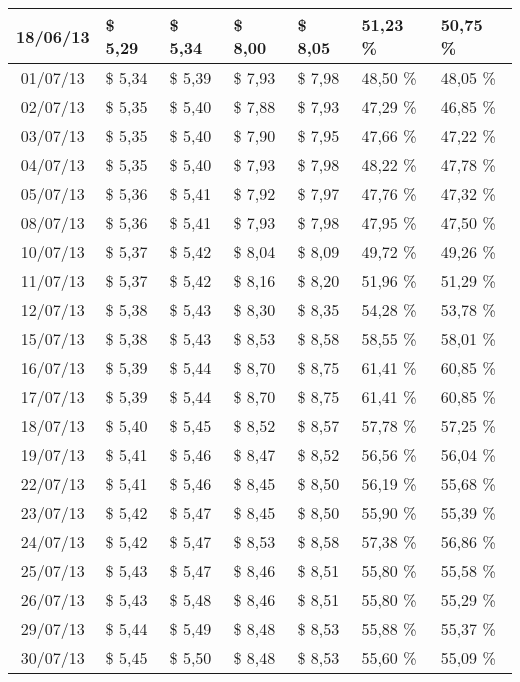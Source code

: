 \begin{center}
\begin{longtable}{|c|p{1.5cm}|p{1.5cm}|p{1.5cm}|p{1.5cm}|p{1.5cm}|p{1.5cm}|}
18/06/13 & \$ 5,29 & \$ 5,34 & \$ 8,00 & \$ 8,05 & 51,23 \% & 50,75 \% \\ \hline
01/07/13 & \$ 5,34 & \$ 5,39 & \$ 7,93 & \$ 7,98 & 48,50 \% & 48,05 \% \\ \hline
02/07/13 & \$ 5,35 & \$ 5,40 & \$ 7,88 & \$ 7,93 & 47,29 \% & 46,85 \% \\ \hline
03/07/13 & \$ 5,35 & \$ 5,40 & \$ 7,90 & \$ 7,95 & 47,66 \% & 47,22 \% \\ \hline
04/07/13 & \$ 5,35 & \$ 5,40 & \$ 7,93 & \$ 7,98 & 48,22 \% & 47,78 \% \\ \hline
05/07/13 & \$ 5,36 & \$ 5,41 & \$ 7,92 & \$ 7,97 & 47,76 \% & 47,32 \% \\ \hline
08/07/13 & \$ 5,36 & \$ 5,41 & \$ 7,93 & \$ 7,98 & 47,95 \% & 47,50 \% \\ \hline
10/07/13 & \$ 5,37 & \$ 5,42 & \$ 8,04 & \$ 8,09 & 49,72 \% & 49,26 \% \\ \hline
11/07/13 & \$ 5,37 & \$ 5,42 & \$ 8,16 & \$ 8,20 & 51,96 \% & 51,29 \% \\ \hline
12/07/13 & \$ 5,38 & \$ 5,43 & \$ 8,30 & \$ 8,35 & 54,28 \% & 53,78 \% \\ \hline
15/07/13 & \$ 5,38 & \$ 5,43 & \$ 8,53 & \$ 8,58 & 58,55 \% & 58,01 \% \\ \hline
16/07/13 & \$ 5,39 & \$ 5,44 & \$ 8,70 & \$ 8,75 & 61,41 \% & 60,85 \% \\ \hline
17/07/13 & \$ 5,39 & \$ 5,44 & \$ 8,70 & \$ 8,75 & 61,41 \% & 60,85 \% \\ \hline
18/07/13 & \$ 5,40 & \$ 5,45 & \$ 8,52 & \$ 8,57 & 57,78 \% & 57,25 \% \\ \hline
19/07/13 & \$ 5,41 & \$ 5,46 & \$ 8,47 & \$ 8,52 & 56,56 \% & 56,04 \% \\ \hline
22/07/13 & \$ 5,41 & \$ 5,46 & \$ 8,45 & \$ 8,50 & 56,19 \% & 55,68 \% \\ \hline
23/07/13 & \$ 5,42 & \$ 5,47 & \$ 8,45 & \$ 8,50 & 55,90 \% & 55,39 \% \\ \hline
24/07/13 & \$ 5,42 & \$ 5,47 & \$ 8,53 & \$ 8,58 & 57,38 \% & 56,86 \% \\ \hline
25/07/13 & \$ 5,43 & \$ 5,47 & \$ 8,46 & \$ 8,51 & 55,80 \% & 55,58 \% \\ \hline
26/07/13 & \$ 5,43 & \$ 5,48 & \$ 8,46 & \$ 8,51 & 55,80 \% & 55,29 \% \\ \hline
29/07/13 & \$ 5,44 & \$ 5,49 & \$ 8,48 & \$ 8,53 & 55,88 \% & 55,37 \% \\ \hline
30/07/13 & \$ 5,45 & \$ 5,50 & \$ 8,48 & \$ 8,53 & 55,60 \% & 55,09 \% \\ \hline

\end{longtable}
\end{center}
